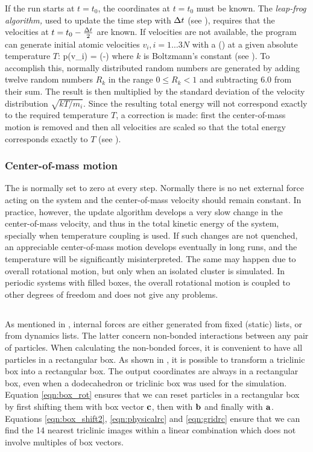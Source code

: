 If the run starts at $t=t_0$, the coordinates at $t=t_0$ must be
known. The {\em leap-frog algorithm,} used to update the time step
with ${\Delta t}$ (see ), requires that the velocities at
$t=t_0 - {\frac {\Delta t}{2}}$ are known. If velocities are not available, the program
can generate initial atomic velocities $v_i, i=1\ldots 3N$ with a
 () at a given
absolute temperature $T$:
\beq 
p(v_i) = \exp(-)
\eeq
where $k$ is Boltzmann's constant (see ).
To accomplish this, normally distributed random numbers are generated
by adding twelve random numbers $R_k$ in the range $0 \le R_k < 1$ and
subtracting 6.0 from their sum. The result is then multiplied by the
standard deviation of the velocity distribution $\sqrt{kT/m_i}$. Since
the resulting total energy will not correspond exactly to the required
temperature $T$, a correction is made: first the center-of-mass motion
is removed and then all velocities are scaled so that the total
energy corresponds exactly to $T$ (see ).

\subsubsection{Center-of-mass motion}
The  is normally set to zero at
every step.  Normally there is no net external force acting on the
system and the center-of-mass velocity should remain constant. In
practice, however, the update algorithm develops a very slow change in
the center-of-mass velocity, and thus in the total kinetic energy of
the system, specially when temperature coupling is used. If such
changes are not quenched, an appreciable center-of-mass motion
develops eventually in long runs, and the temperature will be
significantly misinterpreted. The same may happen due to overall
rotational motion, but only when an isolated cluster is simulated. In
periodic systems with filled boxes, the overall rotational motion is
coupled to other degrees of freedom and does not give any problems.


\subsection{}
\label{subsec:ns}
As mentioned in , internal forces are
either generated from fixed (static) lists, or from dynamics lists.
The latter concern non-bonded interactions between any pair of particles.
When calculating the non-bonded forces, it is convenient to have all
particles in a rectangular box.
As shown in , it is possible to transform a
triclinic box into a rectangular box.
The output coordinates are always in a rectangular box, even when a
dodecahedron or triclinic box was used for the simulation.
Equation \ref{eqn:box_rot} ensures that we can reset particles
in a rectangular box by first shifting them with
box vector ${\bf c}$, then with ${\bf b}$ and finally with ${\bf a}$.
Equations \ref{eqn:box_shift2}, \ref{eqn:physicalrc} and \ref{eqn:gridrc}
ensure that we can find the 14 nearest triclinic images within
a linear combination which does not involve multiples of box vectors.

